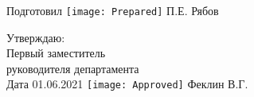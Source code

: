 \documentclass[a4paper,10pt]{article}
\begin{document}
\begin{figure}[H]
	Подготовил
	\hfill
	\texttt{[image: Prepared]}
	П.Е. Рябов
\end{figure}


\begin{figure}[H]
	Утверждаю:\\
	Первый заместитель\\
	руководителя департамента\\
	Дата 01.06.2021
	\hfill
	\texttt{[image: Approved]}
	Феклин В.Г.
\end{figure}
\end{document}
